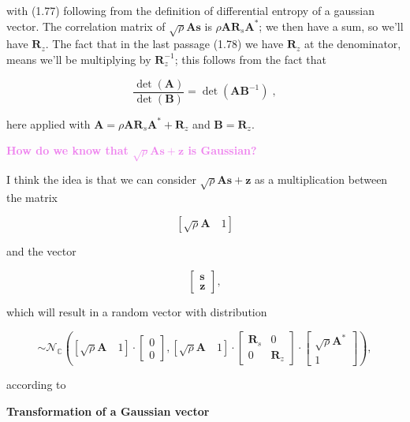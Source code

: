 \documentclass[a4paper, 11pt]{book}
\begin{document}
with (1.77) following from the definition of \textcolor{green!60!black}{differential entropy of a gaussian vector}.
The correlation matrix of $\sqrt{\rho}\bm{A}\bm{s}$ is $\rho\bm{A}\bm{R}_s\bm{A}^*$; we then have a sum, so we'll have $\bm{R}_z$.
The fact that in the last passage (1.78) we have $\bm{R}_z$ at the denominator, means we'll be multiplying by $\bm{R}_z^{-1}$; this follows from the fact that

$$
\frac{\det(\bm{A})}{\det(\bm{B})} = \det(\bm{A}\bm{B}^{-1}) \; ,
$$

here applied with $\bm{A} = \rho\bm{A}\bm{R}_s\bm{A}^* + \bm{R}_z$ and $\bm{B} = \bm{R}_z$.
\begin{tcolorbox}[colframe=violet!80!white, colback=white, boxrule=1pt, arc=2pt]
    \textcolor{violet}{\textbf{\small {} How do we know that $\sqrt{\rho}\bm{A}\bm{s} + \bm{z}$ is Gaussian?}}

    I think the idea is that we can consider $\sqrt{\rho}\bm{A}\bm{s} + \bm{z}$ as a multiplication between the matrix
    
    $$
    [\sqrt{\rho}\bm{A} \quad 1]
    $$
    
    and the vector
    
    $$
    \begin{bmatrix}
    \bm{s} \\
    \bm{z}
    \end{bmatrix},
    $$
    
    which will result in a random vector with distribution
    
    $$
    \sim \mathcal{N}_{\mathbb{C}} \left( [\sqrt{\rho}\bm{A} \quad 1] \cdot \begin{bmatrix} 0 \\ 0 \end{bmatrix}, [\sqrt{\rho}\bm{A} \quad 1] \cdot \begin{bmatrix} \bm{R}_s & 0 \\ 0 & \bm{R}_z \end{bmatrix} \cdot \begin{bmatrix} \sqrt{\rho}\bm{A}^* \\ 1 \end{bmatrix} \right),
    $$
    
    according to
    
    \begin{tcolorbox}[frame empty, sharp corners, boxrule=0pt, leftrule=2pt, colframe=green!60!black, colback=white, left=5pt, top=0pt, bottom=0pt]
        {\Large \textbf{Transformation of a Gaussian vector}}
        

\end{tcolorbox}
\end{tcolorbox}
\end{document}
